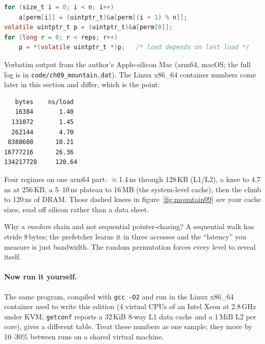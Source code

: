 \begin{lstlisting}[language=C,caption={The heart of
\texttt{mem\_mountain.c}: the dependent-load chain.}]
for (size_t i = 0; i < n; i++)
    a[perm[i]] = (uintptr_t)&a[perm[(i + 1) % n]];
volatile uintptr_t p = (uintptr_t)&a[perm[0]];
for (long r = 0; r < reps; r++)
    p = *(volatile uintptr_t *)p;   /* load depends on last load */
\end{lstlisting}

\begin{example}
Verbatim output from the author's Apple-silicon Mac (arm64, macOS;
the full log is in \texttt{code/ch09\_mountain.dat}). The Linux x86\_64
container numbers come later in this section and differ, which is the
point:

\begin{verbatim}
   bytes    ns/load
   16384       1.40
  131072       1.45
  262144       4.70
 8388608      10.21
16777216      26.36
134217728     120.64
\end{verbatim}

Four regimes on one arm64 part: $\approx$1.4\,ns through 128\,KB
(L1/L2), a knee to 4.7\,ns at 256\,KB, a 5--10\,ns plateau to
16\,MB (the system-level cache), then the climb to 120\,ns of DRAM.
Those dashed knees in figure~\ref{fig:mountain09} \emph{are} your
cache sizes, read off silicon rather than a data sheet.
\end{example}



\begin{checkpoint}
Why a \emph{random} chain and not sequential pointer-chasing? A
sequential walk has stride 8\,bytes; the prefetcher learns it in
three accesses and the ``latency'' you measure is just bandwidth.
The random permutation forces every level to reveal itself.
\end{checkpoint}

\paragraph{Now run it yourself.} The same program, compiled with
\texttt{gcc -O2} and run in the Linux x86\_64 container used to write
this edition (4 virtual CPUs of an Intel Xeon at 2.8\,GHz under KVM;
\texttt{getconf} reports a 32\,KiB 8-way L1 data cache and a 1\,MiB
L2 per core), gives a different table. Treat these numbers as one
sample; they move by 10--30\% between runs on a shared virtual machine.

